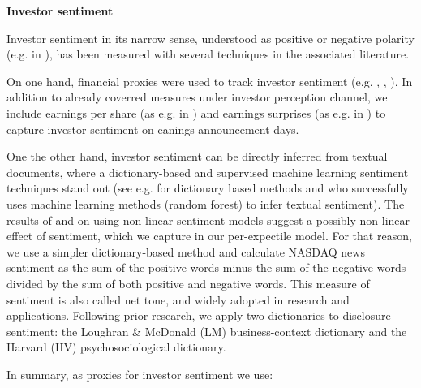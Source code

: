 \documentclass[]{article}
\begin{document}
\vspace{0.5cm}
{\bf {Investor sentiment}}

Investor sentiment in its narrow sense, understood as positive or negative polarity  (e.g. in \cite{FRANKEL2022}), has been measured with several techniques in the associated literature.

On one hand, financial proxies were used to track investor sentiment (e.g. \cite{de1990noise}, \cite{barberis1998model}, \cite{baker2007investor}). In addition to already coverred measures under investor perception channel, we include earnings per share (as e.g. in \cite{henry2006}) and earnings surprises (as e.g. in \cite{Maheu2004}) to capture investor sentiment on eanings announcement days. 

One the other hand, investor sentiment can be directly inferred from textual documents, where a dictionary-based and supervised machine learning sentiment techniques stand out (see e.g. \cite{JEGADEESH2013} for dictionary based methods and \cite{FANG2021} who successfully uses machine learning methods (random forest) to infer textual sentiment). The results of \cite{FANG2021} and \cite{FRANKEL2022} on using non-linear sentiment models suggest a possibly non-linear effect of sentiment, which we capture in our per-expectile model. For that reason, we use a simpler dictionary-based method and calculate NASDAQ news sentiment as the sum of the positive words minus the sum of the negative words divided by the sum of both positive and negative words. This measure of sentiment is also called net tone, and widely adopted in research and applications. Following prior research, we apply two dictionaries to disclosure sentiment: the Loughran \& McDonald (LM) business-context dictionary and the Harvard (HV) psychosociological dictionary.

In summary, as proxies for investor sentiment we use:
\end{document}
